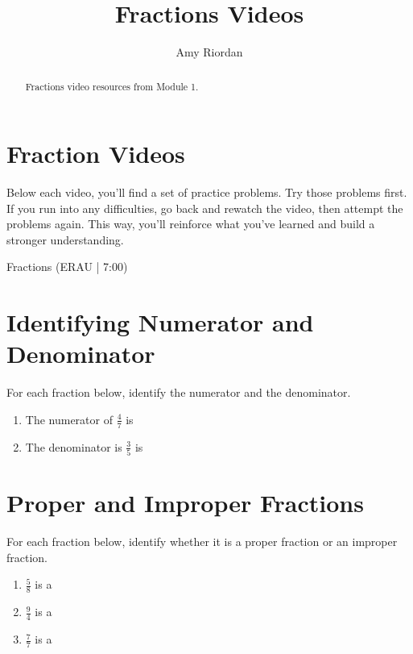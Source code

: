 \documentclass{ximera}
\title{Fractions Videos}
\author{Amy Riordan}
\begin{document}
\begin{abstract}
Fractions video resources from Module 1.
\end{abstract}
\maketitle

\section*{Fraction Videos}

Below each video, you’ll find a set of practice problems. Try those problems first. If you run into any difficulties, go back and rewatch the video, then attempt the problems again. This way, you’ll reinforce what you’ve learned and build a stronger understanding.

Fractions (ERAU | 7:00)



\section*{Identifying Numerator and Denominator}

For each fraction below, identify the numerator and the denominator.

\begin{problem}
\begin{enumerate}
\item The numerator of $\frac{4}{7}$ is 
 
\item The denominator is $\frac{3}{5}$ is 
 
\end{enumerate}
\end{problem}


\section*{Proper and Improper Fractions}

For each fraction below, identify whether it is a proper fraction or an improper fraction.

\begin{problem}
\begin{enumerate}
    \item $\frac{5}{8}$ is a 
    \item $\frac{9}{4}$ is a 
    \item $\frac{7}{7}$ is a 
\end{enumerate}
\end{problem}
\end{document}
